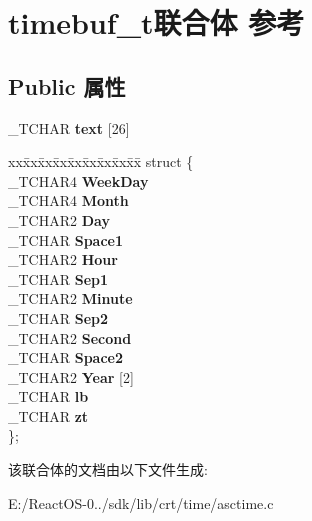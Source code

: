 \hypertarget{uniontimebuf__t}{}\section{timebuf\+\_\+t联合体 参考}
\label{uniontimebuf__t}
\subsection*{Public 属性}
\begin{DoxyCompactItemize}
\item 
\mbox{\label{uniontimebuf__t_afeb193bbd08756ac3f360c26a649aaae}} 
\+\_\+\+T\+C\+H\+AR {\bfseries text} \mbox{[}26\mbox{]}
\item 
\mbox{\label{uniontimebuf__t_ab0c05ce80d811ce89b3ec29b09ad1ad8}} 
\begin{tabbing}
xx\=xx\=xx\=xx\=xx\=xx\=xx\=xx\=xx\=\kill
struct \{\\
\>\_TCHAR4 {\bfseries WeekDay}\\
\>\_TCHAR4 {\bfseries Month}\\
\>\_TCHAR2 {\bfseries Day}\\
\>\_TCHAR {\bfseries Space1}\\
\>\_TCHAR2 {\bfseries Hour}\\
\>\_TCHAR {\bfseries Sep1}\\
\>\_TCHAR2 {\bfseries Minute}\\
\>\_TCHAR {\bfseries Sep2}\\
\>\_TCHAR2 {\bfseries Second}\\
\>\_TCHAR {\bfseries Space2}\\
\>\_TCHAR2 {\bfseries Year} \mbox{[}2\mbox{]}\\
\>\_TCHAR {\bfseries lb}\\
\>\_TCHAR {\bfseries zt}\\
\}; \\

\end{tabbing}\end{DoxyCompactItemize}


该联合体的文档由以下文件生成\+:\begin{DoxyCompactItemize}
\item 
E\+:/\+React\+O\+S-\/0../sdk/lib/crt/time/asctime.\+c\end{DoxyCompactItemize}
